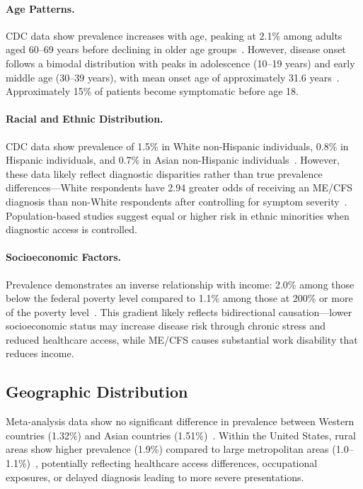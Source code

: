 \paragraph{Age Patterns.}
CDC data show prevalence increases with age, peaking at 2.1\% among adults aged 60--69 years before declining in older age groups~\cite{CDC2023prevalence}. However, disease onset follows a bimodal distribution with peaks in adolescence (10--19 years) and early middle age (30--39 years), with mean onset age of approximately 31.6 years~\cite{Bakken2014incidence}. Approximately 15\% of patients become symptomatic before age 18.

\paragraph{Racial and Ethnic Distribution.}
CDC data show prevalence of 1.5\% in White non-Hispanic individuals, 0.8\% in Hispanic individuals, and 0.7\% in Asian non-Hispanic individuals~\cite{CDC2023prevalence}. However, these data likely reflect diagnostic disparities rather than true prevalence differences---White respondents have 2.94 greater odds of receiving an ME/CFS diagnosis than non-White respondents after controlling for symptom severity~\cite{Dimmock2024disparities}. Population-based studies suggest equal or higher risk in ethnic minorities when diagnostic access is controlled.

\paragraph{Socioeconomic Factors.}
Prevalence demonstrates an inverse relationship with income: 2.0\% among those below the federal poverty level compared to 1.1\% among those at 200\% or more of the poverty level~\cite{CDC2023prevalence}. This gradient likely reflects bidirectional causation---lower socioeconomic status may increase disease risk through chronic stress and reduced healthcare access, while ME/CFS causes substantial work disability that reduces income.

\subsection{Geographic Distribution}
\label{subsec:geographic}

Meta-analysis data show no significant difference in prevalence between Western countries (1.32\%) and Asian countries (1.51\%)~\cite{Lim2020prevalence}. Within the United States, rural areas show higher prevalence (1.9\%) compared to large metropolitan areas (1.0--1.1\%)~\cite{CDC2023prevalence}, potentially reflecting healthcare access differences, occupational exposures, or delayed diagnosis leading to more severe presentations.

